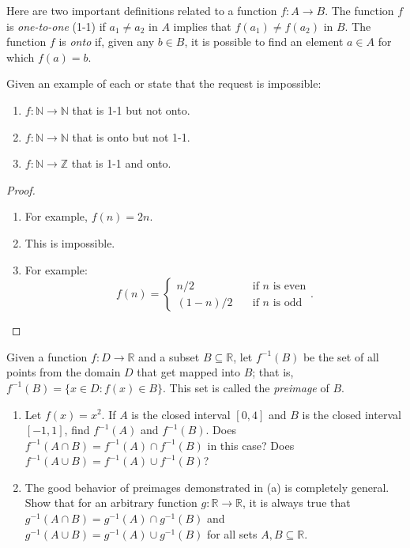 \documentclass[class=understanding-analysis,crop=false]{standalone}
\begin{document}
\begin{exercise}
    \par Here are two important definitions related to a function $f: A\to B$. The function $f$ is \textit{one-to-one} (1{-}1) if $a_{1}\ne a_{2}$ in $A$ implies that $f(a_{1})\ne f(a_{2})$ in $B$. The function $f$ is \textit{onto} if, given any $b\in B$, it is possible to find an element $a\in A$ for which $f(a) = b$.
    \par Given an example of each or state that the request is impossible:
    \begin{enumerate}[label = (\alph*)]
        \item $f : \mathbb{N} \to \mathbb{N}$ that is 1{-}1 but not onto.
        \item $f : \mathbb{N} \to \mathbb{N}$ that is onto but not 1{-}1.
        \item $f : \mathbb{N} \to \mathbb{Z}$ that is 1{-}1 and onto.
    \end{enumerate}
\end{exercise}

\begin{proof}
    \begin{enumerate}[label = (\alph*)]
        \item For example, $f(n) = 2n$.
        \item This is impossible.
        \item For example:
              \[
                  f(n) =
                  \begin{cases}
                      n/2     & \quad\text{if $n$ is even} \\
                      (1-n)/2 & \quad\text{if $n$ is odd}
                  \end{cases}.
              \]
    \end{enumerate}
\end{proof}

\begin{exercise}
    \par Given a function $f: D\to\mathbb{R}$ and a subset $B\subseteq\mathbb{R}$, let $f^{-1}(B)$ be the set of all points from the domain $D$ that get mapped into $B$; that is, $f^{-1}(B) = \{ x\in D : f(x) \in B \}$. This set is called the \textit{preimage} of $B$.
    \begin{enumerate}[label = (\alph*)]
        \item Let $f(x) = x^{2}$. If $A$ is the closed interval $[0, 4]$ and $B$ is the closed interval $[-1, 1]$, find $f^{-1}(A)$ and $f^{-1}(B)$. Does $f^{-1}(A\cap B) = f^{-1}(A)\cap f^{-1}(B)$ in this case? Does $f^{-1}(A\cup B) = f^{-1}(A)\cup f^{-1}(B)$?
        \item The good behavior of preimages demonstrated in (a) is completely general. Show that for an arbitrary function $g: \mathbb{R} \to \mathbb{R}$, it is always true that $g^{-1}(A\cap B) = g^{-1}(A) \cap g^{-1}(B)$ and $g^{-1}(A\cup B) = g^{-1}(A) \cup g^{-1}(B)$ for all sets $A, B\subseteq\mathbb{R}$.
    \end{enumerate}
\end{exercise}
\end{document}
